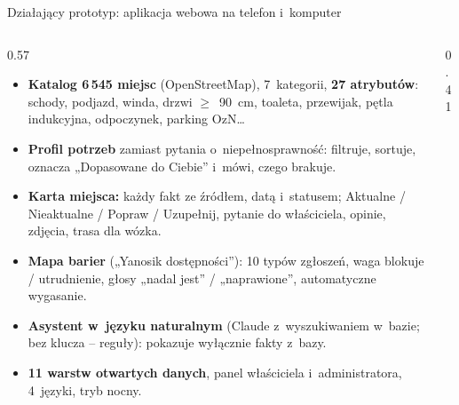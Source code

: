 \begin{frame}{Działający prototyp: aplikacja webowa na telefon i~komputer}
  \begin{columns}[T,onlytextwidth]
    \begin{column}{0.57\textwidth}
      \footnotesize
      \begin{itemize}
        \item \textbf{Katalog 6\,545 miejsc} (OpenStreetMap), 7~kategorii, \textbf{27 atrybutów}: schody, podjazd, winda,
              drzwi $\geq$~90~cm, toaleta, przewijak, pętla indukcyjna, odpoczynek, parking OzN\ldots
        \item \textbf{Profil potrzeb} zamiast pytania o~niepełnosprawność: filtruje, sortuje, oznacza
              „Dopasowane do Ciebie” i~mówi, czego brakuje.
        \item \textbf{Karta miejsca:} każdy fakt ze źródłem, datą i~statusem; Aktualne / Nieaktualne / Popraw / Uzupełnij,
              pytanie do właściciela, opinie, zdjęcia, trasa dla wózka.
        \item \textbf{Mapa barier} („Yanosik dostępności”): 10 typów zgłoszeń, waga blokuje / utrudnienie,
              głosy „nadal jest” / „naprawione”, automatyczne wygasanie.
        \item \textbf{Asystent w~języku naturalnym} (Claude z~wyszukiwaniem w~bazie; bez klucza -- reguły):
              pokazuje wyłącznie fakty z~bazy.
        \item \textbf{11 warstw otwartych danych}, panel właściciela i~administratora, 4~języki, tryb nocny.
      \end{itemize}
    \end{column}
    \begin{column}{0.41\textwidth}
      \vspace{0.3mm}
      \vspace{1.5mm}

      \hfill{}\hfill{}
    \end{column}
  \end{columns}

\end{frame}
